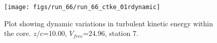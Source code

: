 \begin{figure}[H]
\centering
\texttt{[image: figs/run\_66/run\_66\_ctke\_01rdynamic]}
\caption{Plot showing dynamic variations in turbulent kinetic energy within the core. $z/c$=10.00, $V_{free}$=24.96, station 7.}
\label{fig:run_66_ctke_01rdynamic}
\end{figure}


